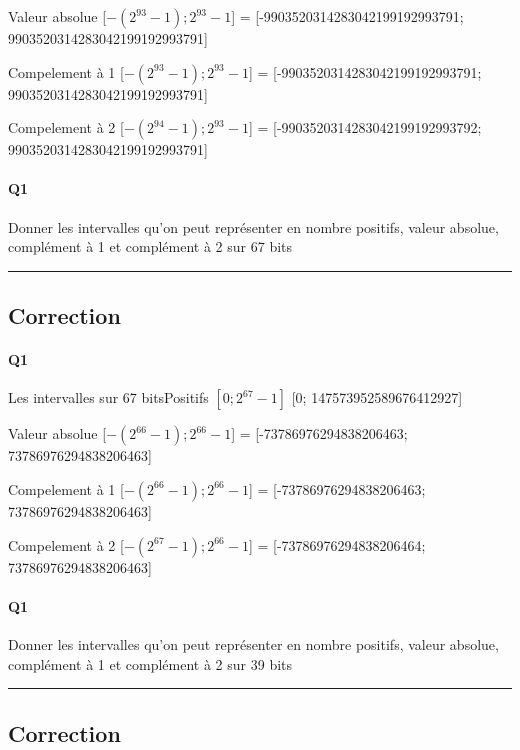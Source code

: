 Valeur absolue [$-(2^{93}-1);2^{93}-1$] = [-9903520314283042199192993791; 9903520314283042199192993791]

Compelement à 1 [$-(2^{93}-1);2^{93}-1$] = [-9903520314283042199192993791; 9903520314283042199192993791]

Compelement à 2 [$-(2^{94}-1);2^{93}-1$] = [-9903520314283042199192993792; 9903520314283042199192993791]
\pagebreak

\paragraph{Q1}

Donner les intervalles qu'on peut représenter en nombre positifs, valeur absolue, complément à 1 et complément à 2  sur 67 bits



\hrule width 1\linewidth
\pagebreak

\subsection{Correction}


\paragraph{Q1}

Les intervalles sur 67 bitsPositifs $[0; 2^{67}-1]$ [0; 147573952589676412927]

Valeur absolue [$-(2^{66}-1);2^{66}-1$] = [-73786976294838206463; 73786976294838206463]

Compelement à 1 [$-(2^{66}-1);2^{66}-1$] = [-73786976294838206463; 73786976294838206463]

Compelement à 2 [$-(2^{67}-1);2^{66}-1$] = [-73786976294838206464; 73786976294838206463]
\pagebreak

\paragraph{Q1}

Donner les intervalles qu'on peut représenter en nombre positifs, valeur absolue, complément à 1 et complément à 2  sur 39 bits



\hrule width 1\linewidth
\pagebreak

\subsection{Correction}


